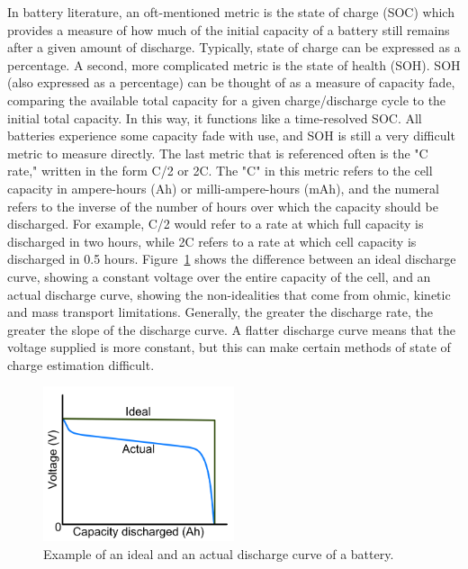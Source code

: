 In battery literature, an oft-mentioned metric is the state of charge (SOC) which provides a measure of how much of the initial capacity of a battery still remains after a given amount of discharge. Typically, state of charge can be expressed as a percentage. A second, more complicated metric is the state of health (SOH). SOH (also expressed as a percentage) can be thought of as a measure of capacity fade, comparing the available total capacity for a given charge/discharge cycle to the initial total capacity. In this way, it functions like a time-resolved SOC. All batteries experience some capacity fade with use, and SOH is still a very difficult metric to measure directly. The last metric that is referenced often is the "C rate," written in the form C/2 or 2C. The "C" in this metric refers to the cell capacity in ampere-hours (Ah) or milli-ampere-hours (mAh), and the numeral refers to the inverse of the number of hours over which the capacity should be discharged. For example, C/2 would refer to a rate at which full capacity is discharged in two hours, while 2C refers to a rate at which cell capacity is discharged in 0.5 hours. Figure~\ref{fig:dischcurve} shows the difference between an ideal discharge curve, showing a constant voltage over the entire capacity of the cell, and an actual discharge curve, showing the non-idealities that come from ohmic, kinetic and mass transport limitations. Generally, the greater the discharge rate, the greater the slope of the discharge curve. A flatter discharge curve means that the voltage supplied is more constant, but this can make certain methods of state of charge estimation difficult. 

\begin{figure}[htb]
  \centering
    \includegraphics[width=0.5\textwidth]{ch2-pastwork/images/dischcurves.png}
    \caption[Example discharge curves.]{Example of an ideal and an actual discharge curve of a battery.}
    \label{fig:dischcurve}
\end{figure}

